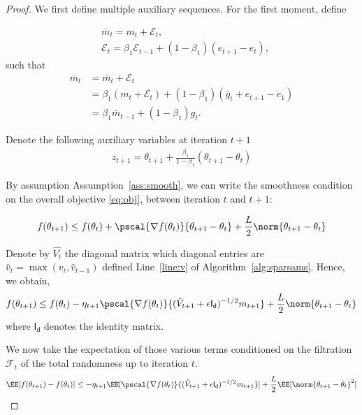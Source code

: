 \documentclass[11pt]{article}
\begin{document}
\begin{proof}


We first define multiple auxiliary sequences. For the first moment, define

\begin{align*}
    &\bar m_t=m_t+\mathcal E_t,\\   
    &\mathcal E_t=\beta_1\mathcal E_{t-1}+(1-\beta_1)(e_{t+1}-e_t),
\end{align*}
such that 
\begin{align*} 
    \bar m_t&=\bar m_t+\mathcal E_t\\
    &=\beta_1(m_t+\mathcal E_t)+(1-\beta_1)(\bar g_t+e_{t+1}-e_1)\\
    &=\beta_1\bar m_{t-1}+(1-\beta_1)g_t.
\end{align*}


Denote the following auxiliary variables at iteration $t+1$
\begin{align}
z_{t+1} = \theta_{t+1} + \frac{\beta_1}{1-\beta_1}(\theta_{t+1} - \theta_{t})
\end{align}

By assumption Assumption~\ref{ass:smooth}, we can write the smoothness condition on the overall objective \eqref{eq:obj}, between iteration $t$ and $t+1$:

\begin{equation}
f(\theta_{t+1}) \leq f(\theta_{t})+  \pscal{\nabla f(\theta_t)}{\theta_{t+1} - \theta_{t}} + \frac{L}{2} \norm{\theta_{t+1} - \theta_{t}}
\end{equation}

Denote by $\hat{V_t}$ the diagonal matrix which diagonal entries are $\hat v_t=\max(v_t,\hat v_{t-1})$ defined Line~\ref{line:v} of Algorithm~\ref{alg:sparsams}.
Hence, we obtain,
\begin{equation}
f(\theta_{t+1}) \leq f(\theta_{t}) - \eta_{t+1} \pscal{\nabla f(\theta_t)}{(\hat{V}_{t+1} + \epsilon \mathsf{I_d})^{-1/2} m_{t+1}} + \frac{L}{2} \norm{\theta_{t+1} - \theta_{t}}
\end{equation}
where $\mathsf{I_d}$ denotes the identity matrix.

We now take the expectation of those various terms conditioned on the filtration $\mathcal{F}_t$ of the total randomness up to iteration $t$.
\begin{equation}\label{eq:smooth1}
\EE[f(\theta_{t+1}) - f(\theta_{t}) ] \leq - \eta_{t+1} \EE[\pscal{\nabla f(\theta_t)}{(\hat{V}_{t+1} + \epsilon \mathsf{I_d})^{-1/2} m_{t+1}}] + \frac{L}{2} \EE[\norm{\theta_{t+1} - \theta_{t}}^2]
\end{equation}


\end{proof}
\end{document}
